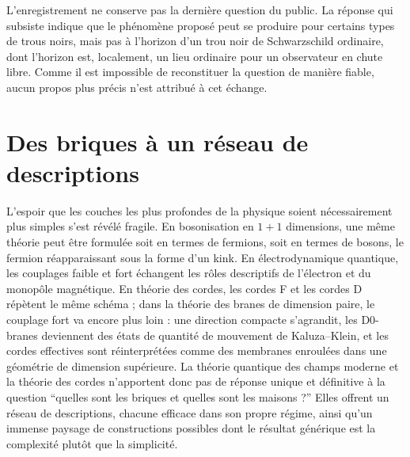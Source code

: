 
L’enregistrement ne conserve pas la dernière question du public. La réponse qui subsiste indique que le phénomène proposé peut se produire pour certains types de trous noirs, mais pas à l’horizon d’un trou noir de Schwarzschild ordinaire, dont l’horizon est, localement, un lieu ordinaire pour un observateur en chute libre. Comme il est impossible de reconstituer la question de manière fiable, aucun propos plus précis n’est attribué à cet échange.

\section{Des briques à un réseau de descriptions}

L’espoir que les couches les plus profondes de la physique soient nécessairement plus simples s’est révélé fragile. En bosonisation en \(1+1\) dimensions, une même théorie peut être formulée soit en termes de fermions, soit en termes de bosons, le fermion réapparaissant sous la forme d’un kink. En électrodynamique quantique, les couplages faible et fort échangent les rôles descriptifs de l’électron et du monopôle magnétique. En théorie des cordes, les cordes F et les cordes D répètent le même schéma ; dans la théorie des branes de dimension paire, le couplage fort va encore plus loin : une direction compacte s’agrandit, les D0-branes deviennent des états de quantité de mouvement de Kaluza--Klein, et les cordes effectives sont réinterprétées comme des membranes enroulées dans une géométrie de dimension supérieure. La théorie quantique des champs moderne et la théorie des cordes n’apportent donc pas de réponse unique et définitive à la question ``quelles sont les briques et quelles sont les maisons ?'' Elles offrent un réseau de descriptions, chacune efficace dans son propre régime, ainsi qu’un immense paysage de constructions possibles dont le résultat générique est la complexité plutôt que la simplicité.
